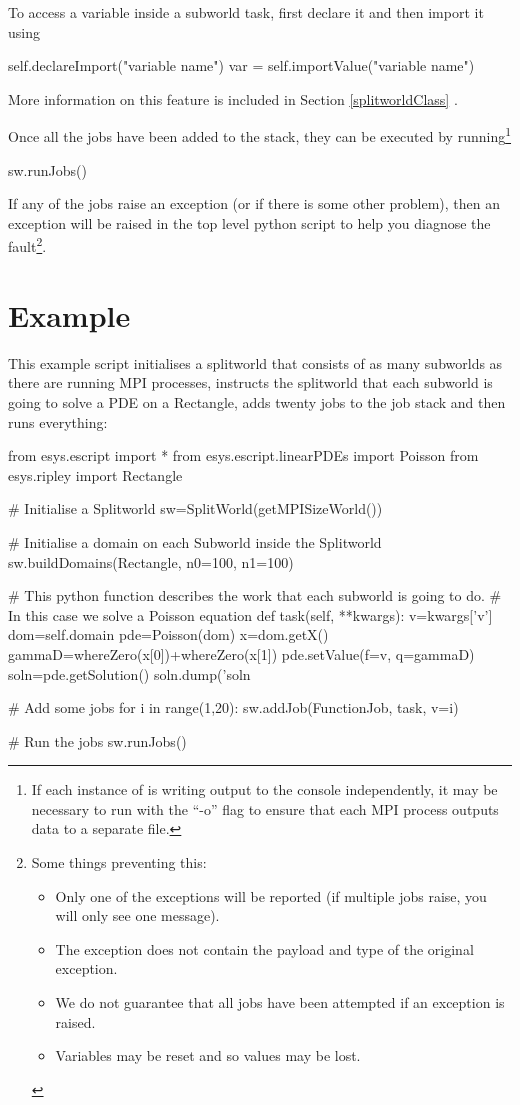 \vspace{\baselineskip}
\noindent To access a variable inside a subworld task, first declare it and then import it using
\begin{python}
self.declareImport("variable name")
var = self.importValue("variable name")
\end{python}
More information on this feature is included in Section \ref{splitworldClass} .

\vspace{\baselineskip}
\noindent Once all the jobs have been added to the stack, they can be executed by running\footnote{If each instance of  is writing output to the console independently, it may be necessary to run \escript with the ``\textrm{-o}'' flag to ensure that each MPI process outputs data to a separate file.}
\begin{python}
sw.runJobs()
\end{python}
If any of the jobs raise an exception (or if there is some other problem), then an exception will be raised in the top level python script to help you diagnose the fault\footnote{
Some things preventing this:
\begin{itemize}
 \item Only one of the exceptions will be reported (if multiple jobs raise, you will only see one message).
 \item The exception does not contain the payload and type of the original exception.
 \item We do not guarantee that all jobs have been attempted if an exception is raised.
 \item Variables may be reset and so values may be lost.
\end{itemize}
}.


\section{Example}
This example script initialises a splitworld that consists of as many subworlds as there are running MPI processes, instructs the splitworld that each subworld is going to solve a PDE on a \ripley Rectangle, adds twenty jobs to the job stack and then runs everything:

\begin{python}
from esys.escript import *
from esys.escript.linearPDEs import Poisson
from esys.ripley import Rectangle 

# Initialise a Splitworld
sw=SplitWorld(getMPISizeWorld())

# Initialise a domain on each Subworld inside the Splitworld
sw.buildDomains(Rectangle, n0=100, n1=100)

# This python function describes the work that each subworld is going to do.
# In this case we solve a Poisson equation
def task(self, **kwargs):
    v=kwargs['v']
    dom=self.domain
    pde=Poisson(dom)
    x=dom.getX()
    gammaD=whereZero(x[0])+whereZero(x[1])
    pde.setValue(f=v, q=gammaD)
    soln=pde.getSolution()
    soln.dump('soln%

# Add some jobs
for i in range(1,20):
    sw.addJob(FunctionJob, task, v=i)

# Run the jobs
sw.runJobs() 
\end{python}

